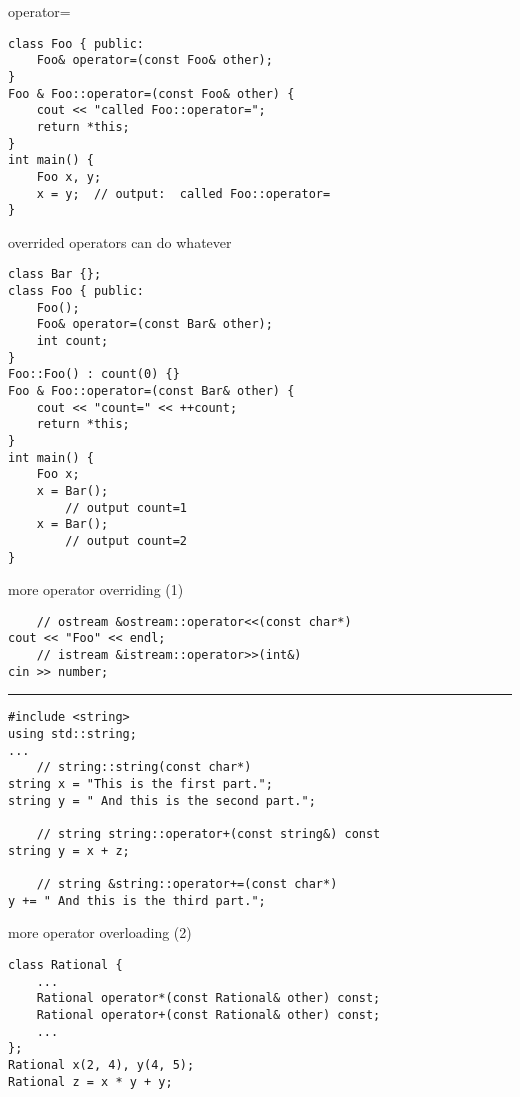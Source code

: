 \begin{frame}[fragile,label=opOverload1]{operator=}
\lstset{language=C++,style=smaller}
\begin{lstlisting}
class Foo { public:
    Foo& operator=(const Foo& other);
}
Foo & Foo::operator=(const Foo& other) {
    cout << "called Foo::operator=";
    return *this;
}
int main() {
    Foo x, y;
    x = y;  // output:  called Foo::operator=
}
\end{lstlisting}
\end{frame}

\begin{frame}[fragile,label=opOverload2]{overrided operators can do whatever}
\lstset{language=C++,style=smaller}
\begin{lstlisting}
class Bar {};
class Foo { public:
    Foo();
    Foo& operator=(const Bar& other);
    int count;
}
Foo::Foo() : count(0) {}
Foo & Foo::operator=(const Bar& other) {
    cout << "count=" << ++count;
    return *this;
}
int main() {
    Foo x;
    x = Bar();
        // output count=1
    x = Bar();
        // output count=2
}
\end{lstlisting}
\end{frame}


\begin{frame}[fragile,label=opOverExs]{more operator overriding (1)}
\lstset{language=C++,style=smaller}
\begin{lstlisting}
    // ostream &ostream::operator<<(const char*)
cout << "Foo" << endl;
    // istream &istream::operator>>(int&)
cin >> number;
\end{lstlisting}
\hrule
\begin{lstlisting}
#include <string>
using std::string;
...
    // string::string(const char*)
string x = "This is the first part.";
string y = " And this is the second part.";

    // string string::operator+(const string&) const
string y = x + z;

    // string &string::operator+=(const char*)
y += " And this is the third part.";
\end{lstlisting}
\end{frame}

\begin{frame}[fragile,label=opOverExs2]{more operator overloading (2)}
\begin{lstlisting}
class Rational {
    ...
    Rational operator*(const Rational& other) const;
    Rational operator+(const Rational& other) const;
    ...
};
Rational x(2, 4), y(4, 5);
Rational z = x * y + y;
\end{lstlisting}
\end{frame}


